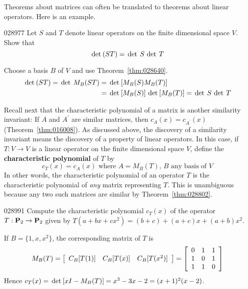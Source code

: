 Theorems about matrices can often be translated to theorems about linear operators. Here is an example.


\begin{example}{}{028977}
Let $S$ and $T$ denote linear operators on the finite dimensional space $V$. Show that
\begin{equation*}
\thinspace\operatorname{det \medspace}(ST) = \thinspace\operatorname{det \medspace} S \thinspace\operatorname{det \medspace} T
\end{equation*}
\vspace*{-2em}\begin{solution}
  Choose a basis $B$ of $V$ and use Theorem~\ref{thm:028640}.
\begin{align*}
\thinspace\operatorname{det \medspace}(ST) = \thinspace\operatorname{det \medspace} M_B(ST) & = \thinspace\operatorname{det \medspace} [M_B(S)M_B(T)] \\
& = \thinspace\operatorname{det \medspace} [M_B(S)] \thinspace\operatorname{det \medspace} [M_B(T)] = \thinspace\operatorname{det \medspace} S \thinspace\operatorname{det \medspace} T
\end{align*}
\end{solution}
\end{example}

Recall next that the characteristic polynomial of a matrix is another similarity invariant: If $A$ and $A^{\prime}$ are similar matrices, then $c_{A}(x) = c_{A^{\prime}}(x)$ (Theorem~\ref{thm:016008}). As discussed above, the discovery of a similarity invariant means the discovery of a property of linear operators. In this case, if $T : V \to V$ is a linear operator on the finite dimensional space $V$, define the \textbf{characteristic polynomial} of $T$ by
\begin{equation*}
c_T(x) = c_A(x) \mbox{ where } A = M_B(T) \mbox{, } B \mbox{ any basis of } V
\end{equation*}
In other words, the characteristic polynomial of an operator $T$ is the characteristic polynomial of \textit{any} matrix representing $T$. This is unambiguous because any two such matrices are similar by Theorem~\ref{thm:028802}.


\begin{example}{}{028991}
Compute the characteristic polynomial $c_{T}(x)$ of the operator $T : \textbf{P}_{2} \to \textbf{P}_{2}$ given by $T(a + bx + cx^{2}) = (b + c) + (a + c)x + (a + b)x^{2}$.


\begin{solution}
  If $B = \{1, x, x^{2}\}$, the corresponding matrix of $T$ is
\begin{equation*}
M_B(T) = \left[ \begin{array}{ccc} C_B[T(1)] & C_B[T(x)] & C_B[T(x^2)] \end{array} \right] = \left[ \begin{array}{rrr} 0 & 1 & 1 \\ 1 & 0 & 1 \\ 1 & 1 & 0 \end{array} \right]
\end{equation*}
Hence $c_{T}(x) = \thinspace\operatorname{det\medspace}[xI - M_{B}(T)] = x^{3} - 3x - 2 = (x + 1)^{2}(x - 2)$.
\end{solution}
\end{example}

